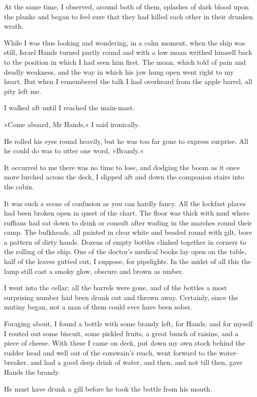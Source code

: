 At the same time, I observed, around both of them, splashes of dark blood upon the planks and began to feel sure that they had killed each other in their drunken wrath.

While I was thus looking and wondering, in a calm moment, when the ship was still, Israel Hands turned partly round and with a low moan writhed himself back to the position in which I had seen him first. The moan, which told of pain and deadly weakness, and the way in which his jaw hung open went right to my heart. But when I remembered the talk I had overheard from the apple barrel, all pity left me.

I walked aft until I reached the main-mast.

»Come aboard, Mr Hands,« I said ironically.

He rolled his eyes round heavily, but he was too far gone to express surprise. All he could do was to utter one word, »Brandy.«

It occurred to me there was no time to lose, and dodging the boom as it once more lurched across the deck, I slipped aft and down the companion stairs into the cabin.

It was such a scene of confusion as you can hardly fancy. All the lockfast places had been broken open in quest of the chart. The floor was thick with mud where ruffians had sat down to drink or consult after wading in the marshes round their camp. The bulkheads, all painted in clear white and beaded round with gilt, bore a pattern of dirty hands. Dozens of empty bottles clinked together in corners to the rolling of the ship. One of the doctor's medical books lay open on the table, half of the leaves gutted out, I suppose, for pipelights. In the midst of all this the lamp still cast a smoky glow, obscure and brown as umber.

I went into the cellar; all the barrels were gone, and of the bottles a most surprising number had been drunk out and thrown away. Certainly, since the mutiny began, not a man of them could ever have been sober.

Foraging about, I found a bottle with some brandy left, for Hands; and for myself I routed out some biscuit, some pickled fruits, a great bunch of raisins, and a piece of cheese. With these I came on deck, put down my own stock behind the rudder head and well out of the coxswain's reach, went forward to the water-breaker, and had a good deep drink of water, and then, and not till then, gave Hands the brandy.

He must have drunk a gill before he took the bottle from his mouth.

